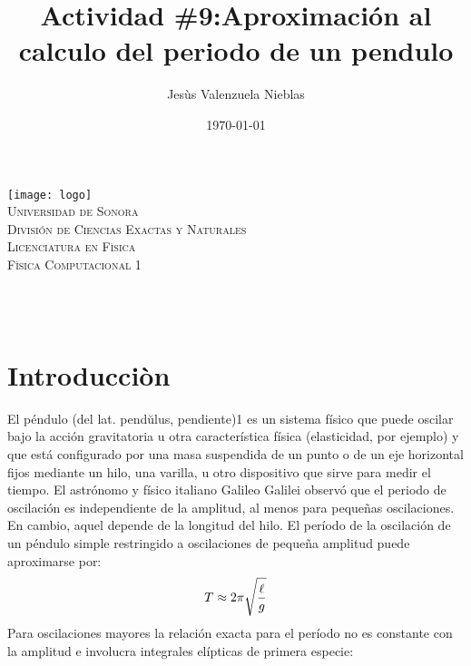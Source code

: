 \documentclass[12pt]{article}
\title{Actividad \#9:Aproximación al calculo del periodo de un pendulo}
\author{\Large Jesùs Valenzuela Nieblas\\}
\date{\today}
\makeatletter
\let\thetitle\@title
\let\theauthor\@author
\makeatother
\begin{document}

\begin{titlepage}
	\centering
    \vspace*{.5cm}
     \texttt{[image: logo]}\\	%
    \textsc{\Large Universidad de Sonora}\\[1.0 cm]	%
	\textsc{\Large División de Ciencias Exactas y Naturales}\\[.50 cm]
  	\textsc{\Large Licenciatura en Fìsica}\\[.5 cm]
  \textsc{\large Fìsica Computacional 1}\\[1.5 cm]				%
	
	{ \huge \bfseries \thetitle}\\

    \vspace*{3 cm}
	\begin{minipage}{\textwidth}
    \centering
    \theauthor
	\end{minipage}\\[3 cm]
	
 
	\vfill
	
\end{titlepage}


\section{Introducciòn}
El péndulo (del lat. pendŭlus, pendiente)1 es un sistema físico que puede oscilar bajo la acción gravitatoria u otra característica física (elasticidad, por ejemplo) y que está configurado por una masa suspendida de un punto o de un eje horizontal fijos mediante un hilo, una varilla, u otro dispositivo que sirve para medir el tiempo.
El astrónomo y físico italiano Galileo Galilei observó que el periodo de oscilación es independiente de la amplitud, al menos para pequeñas oscilaciones. En cambio, aquel depende de la longitud del hilo. El período de la oscilación de un péndulo simple restringido a oscilaciones de pequeña amplitud puede aproximarse por:
\begin{equation}
T \approx 2 \pi \sqrt{\ell\over g}
\end{equation}
Para oscilaciones mayores la relación exacta para el período no es constante con la amplitud e involucra integrales elípticas de primera especie:
\end{document}
